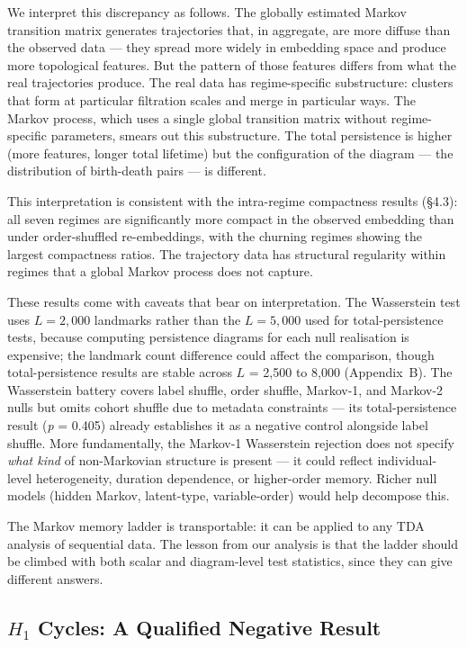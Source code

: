 We interpret this discrepancy as follows. The globally estimated Markov transition matrix generates trajectories that, in aggregate, are more diffuse than the observed data --- they spread more widely in embedding space and produce more topological features. But the pattern of those features differs from what the real trajectories produce. The real data has regime-specific substructure: clusters that form at particular filtration scales and merge in particular ways. The Markov process, which uses a single global transition matrix without regime-specific parameters, smears out this substructure. The total persistence is higher (more features, longer total lifetime) but the configuration of the diagram --- the distribution of birth-death pairs --- is different.

This interpretation is consistent with the intra-regime compactness results (\S4.3): all seven regimes are significantly more compact in the observed embedding than under order-shuffled re-embeddings, with the churning regimes showing the largest compactness ratios. The trajectory data has structural regularity within regimes that a global Markov process does not capture.

These results come with caveats that bear on interpretation. The Wasserstein test uses $L = 2{,}000$ landmarks rather than the $L = 5{,}000$ used for total-persistence tests, because computing persistence diagrams for each null realisation is expensive; the landmark count difference could affect the comparison, though total-persistence results are stable across $L$ = 2,500 to 8,000 (Appendix~B). The Wasserstein battery covers label shuffle, order shuffle, Markov-1, and Markov-2 nulls but omits cohort shuffle due to metadata constraints --- its total-persistence result (\textit{p} = 0.405) already establishes it as a negative control alongside label shuffle. More fundamentally, the Markov-1 Wasserstein rejection does not specify \textit{what kind} of non-Markovian structure is present --- it could reflect individual-level heterogeneity, duration dependence, or higher-order memory. Richer null models (hidden Markov, latent-type, variable-order) would help decompose this.

The Markov memory ladder is transportable: it can be applied to any TDA analysis of sequential data. The lesson from our analysis is that the ladder should be climbed with both scalar and diagram-level test statistics, since they can give different answers.

\subsection{$H_1$ Cycles: A Qualified Negative Result}

